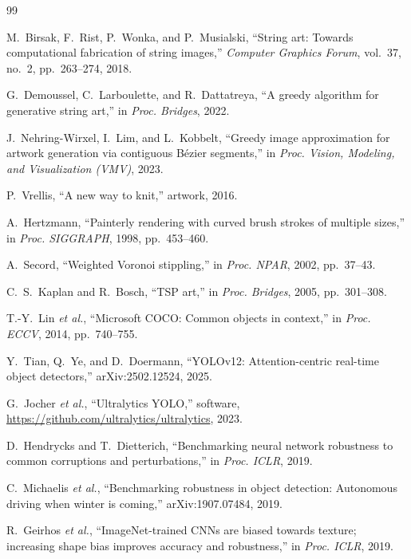\documentclass[conference]{IEEEtran}
\begin{document}
\begin{thebibliography}{99}
\footnotesize

 M.~Birsak, F.~Rist, P.~Wonka, and P.~Musialski, ``String art: Towards computational fabrication of string images,'' \emph{Computer Graphics Forum}, vol.~37, no.~2, pp.~263--274, 2018.

 G.~Demoussel, C.~Larboulette, and R.~Dattatreya, ``A greedy algorithm for generative string art,'' in \emph{Proc. Bridges}, 2022.

 J.~Nehring-Wirxel, I.~Lim, and L.~Kobbelt, ``Greedy image approximation for artwork generation via contiguous B\'ezier segments,'' in \emph{Proc. Vision, Modeling, and Visualization (VMV)}, 2023.

 P.~Vrellis, ``A new way to knit,'' artwork, 2016.

 A.~Hertzmann, ``Painterly rendering with curved brush strokes of multiple sizes,'' in \emph{Proc. SIGGRAPH}, 1998, pp.~453--460.

 A.~Secord, ``Weighted Voronoi stippling,'' in \emph{Proc. NPAR}, 2002, pp.~37--43.

 C.~S.~Kaplan and R.~Bosch, ``TSP art,'' in \emph{Proc. Bridges}, 2005, pp.~301--308.

 T.-Y.~Lin \emph{et al.}, ``Microsoft COCO: Common objects in context,'' in \emph{Proc. ECCV}, 2014, pp.~740--755.

 Y.~Tian, Q.~Ye, and D.~Doermann, ``YOLOv12: Attention-centric real-time object detectors,'' arXiv:2502.12524, 2025.

 G.~Jocher \emph{et al.}, ``Ultralytics YOLO,'' software, \url{https://github.com/ultralytics/ultralytics}, 2023.

 D.~Hendrycks and T.~Dietterich, ``Benchmarking neural network robustness to common corruptions and perturbations,'' in \emph{Proc. ICLR}, 2019.

 C.~Michaelis \emph{et al.}, ``Benchmarking robustness in object detection: Autonomous driving when winter is coming,'' arXiv:1907.07484, 2019.

 R.~Geirhos \emph{et al.}, ``ImageNet-trained CNNs are biased towards texture; increasing shape bias improves accuracy and robustness,'' in \emph{Proc. ICLR}, 2019.


\end{thebibliography}
\end{document}
